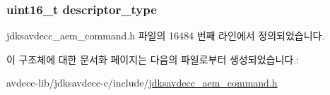 \subsubsection[{\texorpdfstring{descriptor\+\_\+type}{descriptor_type}}]{\setlength{\rightskip}{0pt plus 5cm}uint16\+\_\+t descriptor\+\_\+type}\hypertarget{structjdksavdecc__aem__command__get__clock__source__response_ab7c32b6c7131c13d4ea3b7ee2f09b78d}{}\label{structjdksavdecc__aem__command__get__clock__source__response_ab7c32b6c7131c13d4ea3b7ee2f09b78d}


jdksavdecc\+\_\+aem\+\_\+command.\+h 파일의 16484 번째 라인에서 정의되었습니다.



이 구조체에 대한 문서화 페이지는 다음의 파일로부터 생성되었습니다.\+:\begin{DoxyCompactItemize}
\item 
avdecc-\/lib/jdksavdecc-\/c/include/\hyperlink{jdksavdecc__aem__command_8h}{jdksavdecc\+\_\+aem\+\_\+command.\+h}\end{DoxyCompactItemize}
